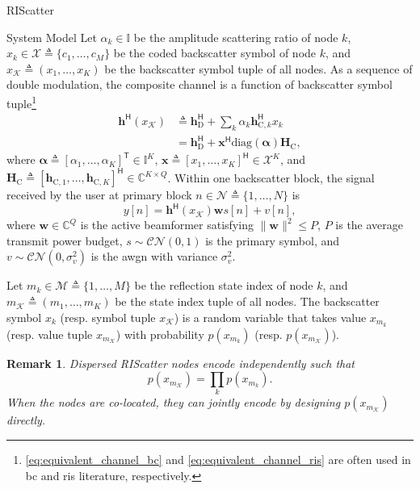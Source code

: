 \documentclass[journal]{IEEEtran}
\newtheorem{remark}{Remark}
\begin{document}
\begin{section}{RIScatter}
\begin{subsection}{System Model}
		Let $\alpha_k \in \mathbb{I}$ be the amplitude scattering ratio of node $k$, $x_k \in \mathcal{X} \triangleq \{c_1,\ldots,c_M\}$ be the coded backscatter symbol of node $k$, and $x_{\mathcal{K}} \triangleq (x_1,\ldots,x_K)$ be the backscatter symbol tuple of all nodes.
		As a sequence of double modulation, the composite channel is a function of backscatter symbol tuple\footnote{\eqref{eq:equivalent_channel_bc} and \eqref{eq:equivalent_channel_ris} are often used in \gls{bc} and \gls{ris} literature, respectively.}
		\begin{subequations}
			\label{eq:equivalent_channel}
			\begin{align}
				\boldsymbol{h}^\mathsf{H}(x_{\mathcal{K}})
				 & \triangleq \boldsymbol{h}_{\text{D}}^\mathsf{H} + \sum_{k} \alpha_k \boldsymbol{h}_{\text{C},k}^\mathsf{H} x_k \label{eq:equivalent_channel_bc}                    \\
				 & = \boldsymbol{h}_{\text{D}}^\mathsf{H} + \boldsymbol{x}^\mathsf{H} \mathrm{diag}(\boldsymbol{\alpha}) \boldsymbol{H}_{\text{C}}, \label{eq:equivalent_channel_ris}
			\end{align}
		\end{subequations}
		where $\boldsymbol{\alpha} \triangleq [\alpha_1,\ldots,\alpha_K]^\mathsf{T} \in \mathbb{I}^{K}$, $\boldsymbol{x} \triangleq [x_1,\ldots,x_K]^\mathsf{H} \in \mathcal{X}^{K}$, and $\boldsymbol{H}_{\text{C}} \triangleq [\boldsymbol{h}_{\text{C},1},\ldots,\boldsymbol{h}_{\text{C},K}]^\mathsf{H} \in \mathbb{C}^{K \times Q}$.
		Within one backscatter block, the signal received by the user at primary block $n \in \mathcal{N} \triangleq \{1,\ldots,N\}$ is
		\begin{equation}
			y[n] = \boldsymbol{h}^\mathsf{H}(x_{\mathcal{K}}) \boldsymbol{w} s[n] + v[n],
			\label{eq:receive_signal}
		\end{equation}
		where $\boldsymbol{w} \in \mathbb{C}^{Q}$ is the active beamformer satisfying $\lVert \boldsymbol{w} \rVert^2 \le P$, $P$ is the average transmit power budget, $s \sim \mathcal{CN}(0,1)$ is the primary symbol, and $v \sim \mathcal{CN}(0,\sigma_v^2)$ is the \gls{awgn} with variance $\sigma_v^2$.

		Let $m_k \in \mathcal{M} \triangleq \{1,\ldots,M\}$ be the reflection state index of node $k$, and $m_{\mathcal{K}} \triangleq (m_1,\ldots,m_K)$ be the state index tuple of all nodes.
		The backscatter symbol $x_k$ (resp. symbol tuple $x_{\mathcal{K}}$) is a random variable that takes value $x_{m_k}$ (resp. value tuple $x_{m_{\mathcal{K}}}$) with probability $p(x_{m_k})$ (resp. $p(x_{m_{\mathcal{K}}})$).
		\begin{remark}
			Dispersed RIScatter nodes encode independently such that
			\begin{equation}
				p(x_{m_{\mathcal{K}}}) = \prod_k p(x_{m_k}).
				\label{eq:equivalent_distribution}
			\end{equation}
			When the nodes are co-located, they can jointly encode by designing $p(x_{m_{\mathcal{K}}})$ directly.
		\end{remark}


\end{subsection}
\end{section}
\end{document}
